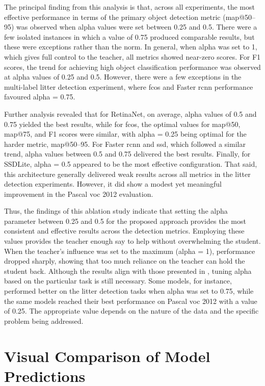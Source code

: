 The principal finding from this analysis is that, across all experiments, the most effective performance in terms of the primary object detection metric (\gls{map}@50–95) was observed when \gls{alpha} values were set between 0.25 and 0.5. There were a few isolated instances in which a value of 0.75 produced comparable results, but these were exceptions rather than the norm. In general, when \gls{alpha} was set to 1, which gives full control to the teacher, all metrics showed near-zero scores. For F1 scores, the trend for achieving high object classification performance was observed at \gls{alpha} values of 0.25 and 0.5. However, there were a few exceptions in the multi-label litter detection experiment, where \gls{fcos} and Faster \gls{rcnn} performance favoured \gls{alpha} = 0.75. 

Further analysis revealed that for RetinaNet, on average, \gls{alpha} values of 0.5 and 0.75 yielded the best results, while for \gls{fcos}, the optimal values for \gls{map}@50, \gls{map}@75, and F1 scores were similar, with \gls{alpha} = 0.25 being optimal for the harder metric, \gls{map}@50–95. For Faster \gls{rcnn} and \gls{ssd}, which followed a similar trend, \gls{alpha} values between 0.5 and 0.75 delivered the best results. Finally, for SSDLite, \gls{alpha} = 0.5 appeared to be the most effective configuration. That said, this architecture generally delivered weak results across all metrics in the litter detection experiments. However, it did show a modest yet meaningful improvement in the Pascal \gls{voc} 2012 evaluation.

Thus, the findings of this ablation study indicate that setting the \gls{alpha} parameter between 0.25 and 0.5 for the proposed approach provides the most consistent and effective results across the detection metrics. Employing these values provides the teacher enough say to help without overwhelming the student. When the teacher’s influence was set to the maximum (\gls{alpha} = 1), performance dropped sharply, showing that too much reliance on the teacher can hold the student back. Although the results align with those presented in \cite{lab2wild}, tuning \gls{alpha} based on the particular task is still necessary. Some models, for instance, performed better on the litter detection tasks when \gls{alpha} was set to 0.75, while the same models reached their best performance on Pascal \gls{voc} 2012 with a value of 0.25. The appropriate value depends on the nature of the data and the specific problem being addressed.


\section{Visual Comparison of Model Predictions}
\label{sec:5_visual_results}

